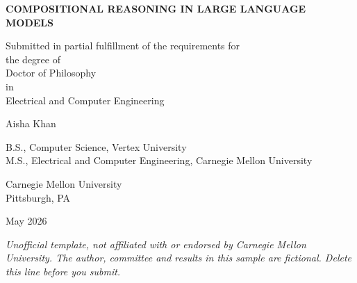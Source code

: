 \begin{titlepage}
\centering
\begin{singlespace}
\vspace*{0.8in}
{\bfseries\MakeUppercase{Compositional Reasoning in Large Language Models}\par}
\vspace{0.8in}
Submitted in partial fulfillment of the requirements for\\
the degree of\\
Doctor of Philosophy\\
in\\
Electrical and Computer Engineering\par
\vspace{0.6in}
Aisha Khan\par
\vspace{0.3in}
B.S., Computer Science, Vertex University\\
M.S., Electrical and Computer Engineering, Carnegie Mellon University\par
\vspace{0.8in}
Carnegie Mellon University\\
Pittsburgh, PA\par
\vspace{0.4in}
May 2026
\end{singlespace}
\vfill
{\footnotesize\itshape Unofficial template, not affiliated with or endorsed by Carnegie Mellon University. The author, committee and results in this sample are fictional. Delete this line before you submit.}
\end{titlepage}
